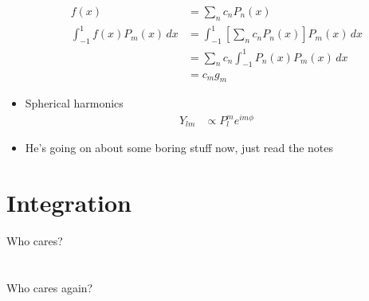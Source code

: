 \documentclass[cplx.tex]{subfiles}
\begin{document}
\begin{itemize}
        \begin{align}
            f(x) &= \sum_n c_n P_n(x) \\
            \int_{-1}^1 f(x)P_m(x)\,dx &= \int_{-1}^1 \left[\sum_n c_nP_n(x)\right]P_m(x)\,dx \\
                                       &= \sum_n c_n \int_{-1}^1 P_n(x)P_m(x)\, dx \\
                                       &= c_m g_m
        \end{align}
    \item Spherical harmonics
        \begin{align}
            Y_{lm} &\propto P_l^m e^{im\phi}
        \end{align}
    \item He's going on about some boring stuff now, just read the notes
\end{itemize}

\chapter{Integration}
Who cares?

\chapter{}
Who cares again?
\end{document}
